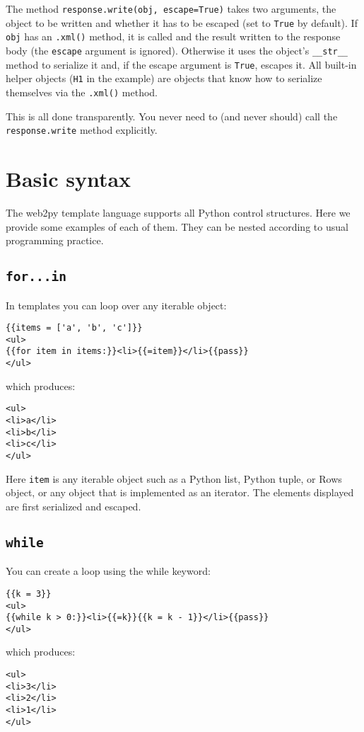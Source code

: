 \documentclass[justified,sixbynine,notoc]{tufte-book}
\def\ft{\small\tt}
\def\inxx#1{\index{#1}}
\begin{document}
\begin{fullwidth}
The method {\ft response.write(obj, escape=True)} takes two arguments, the object to be written and whether it has to be escaped (set to {\ft True} by default). If {\ft obj} has an {\ft .xml()} method, it is called and the result written to the response body (the {\ft escape} argument is ignored). Otherwise it uses the object's {\ft \_\_str\_\_} method to serialize it and, if the escape argument is {\ft True}, escapes it. All built-in helper objects ({\ft H1} in the example) are objects that know how to serialize themselves via the {\ft .xml()} method.

This is all done transparently. You never need to (and never should) call the {\ft response.write} method explicitly.

\goodbreak\section{Basic syntax}

The web2py template language supports all Python control structures. Here we provide some examples of each of them. They can be nested according to usual programming practice.

\goodbreak\subsection{{\ft for...in}}

\inxx{for}

In templates you can loop over any iterable object:
\begin{lstlisting}[keywords={}]
{{items = ['a', 'b', 'c']}}
<ul>
{{for item in items:}}<li>{{=item}}</li>{{pass}}
</ul>
\end{lstlisting}
\noindent which produces:
\begin{lstlisting}[keywords={}]
<ul>
<li>a</li>
<li>b</li>
<li>c</li>
</ul>
\end{lstlisting}

Here {\ft item} is any iterable object such as a Python list, Python tuple, or Rows object, or any object that is implemented as an iterator. The elements displayed are first serialized and escaped.

\goodbreak\subsection{{\ft while}}

\inxx{while}

You can create a loop using the while keyword:
\begin{lstlisting}[keywords={}]
{{k = 3}}
<ul>
{{while k > 0:}}<li>{{=k}}{{k = k - 1}}</li>{{pass}}
</ul>
\end{lstlisting}
\noindent which produces:
\begin{lstlisting}[keywords={}]
<ul>
<li>3</li>
<li>2</li>
<li>1</li>
</ul>
\end{lstlisting}


\end{fullwidth}
\end{document}
